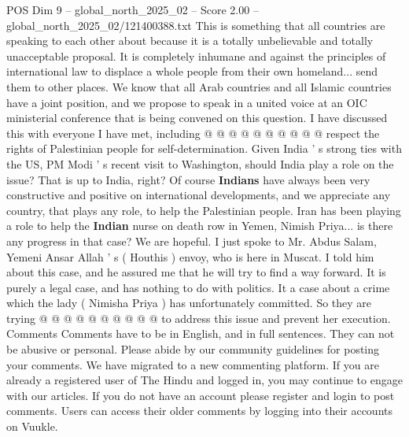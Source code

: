 \begin{textsample}{POS Dim 9 – global\_north\_2025\_02 – Score 2.00 – global\_north\_2025\_02/121400388.txt}
This is something that all countries are speaking to each other about because it is a totally unbelievable and totally unacceptable proposal.
It is completely inhumane and against the principles of international law to displace a whole people from their own homeland... send them to other places.
We know that all Arab countries and all Islamic countries have a joint position, and we propose to speak in a united voice at an OIC ministerial conference that is being convened on this question.
I have discussed this with everyone I have met, including @ @ @ @ @ @ @ @ @ @ respect the rights of Palestinian people for self-determination.
Given India ' s strong ties with the US, PM Modi ' s recent visit to Washington, should India play a role on the issue?
That is up to India, right?
Of course \textbf{Indians} have always been very constructive and positive on international developments, and we appreciate any country, that plays any role, to help the Palestinian people.
Iran has been playing a role to help the \textbf{Indian} nurse on death row in Yemen, Nimish Priya... is there any progress in that case?
We are hopeful.
I just spoke to Mr.
Abdus Salam, Yemeni Ansar Allah ' s ( Houthis ) envoy, who is here in Muscat.
I told him about this case, and he assured me that he will try to find a way forward.
It is purely a legal case, and has nothing to do with politics.
It a case about a crime which the lady ( Nimisha Priya ) has unfortunately committed.
So they are trying @ @ @ @ @ @ @ @ @ @ to address this issue and prevent her execution.
Comments Comments have to be in English, and in full sentences.
They can not be abusive or personal.
Please abide by our community guidelines for posting your comments.
We have migrated to a new commenting platform.
If you are already a registered user of The Hindu and logged in, you may continue to engage with our articles.
If you do not have an account please register and login to post comments.
Users can access their older comments by logging into their accounts on Vuukle.

\end{textsample}
